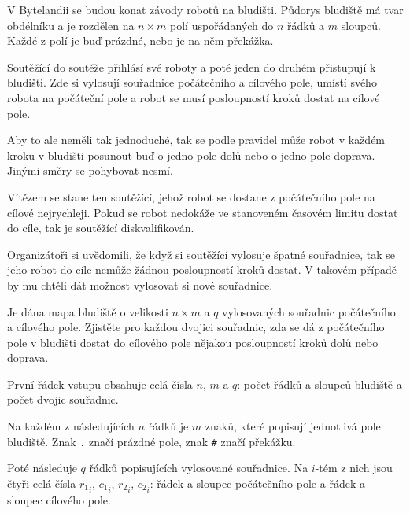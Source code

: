 





V Bytelandii se budou konat závody robotů na bludišti. Půdorys bludiště má tvar
obdélníku a je rozdělen na $n \times m$ polí uspořádaných do $n$ řádků a $m$
sloupců. Každé z polí je buď prázdné, nebo je na něm překážka.

Soutěžící do soutěže přihlásí své roboty a poté jeden do druhém přistupují
k bludišti. Zde si vylosují souřadnice počátečního a cílového pole, umístí svého
robota na počáteční pole a robot se musí posloupností kroků dostat na cílové
pole.

Aby to ale neměli tak jednoduché, tak se podle pravidel může robot v každém
kroku v bludišti posunout buď o jedno pole dolů nebo o jedno pole doprava.
Jinými směry se pohybovat nesmí.

Vítězem se stane ten soutěžící, jehož robot se dostane z počátečního pole na
cílové nejrychleji. Pokud se robot nedokáže ve stanoveném časovém limitu dostat
do cíle, tak je soutěžící diskvalifikován.

Organizátoři si uvědomili, že když si soutěžící vylosuje špatné souřadnice, tak
se jeho robot do cíle nemůže žádnou posloupností kroků dostat. V takovém případě
by mu chtěli dát možnost vylosovat si nové souřadnice.


Je dána mapa bludiště o velikosti $n \times m$ a $q$ vylosovaných souřadnic
počátečního a cílového pole. Zjistěte pro každou dvojici souřadnic, zda se dá
z počátečního pole v bludišti dostat do cílového pole nějakou posloupností kroků
dolů nebo doprava.


První řádek vstupu obsahuje celá čísla $n$, $m$ a $q$: počet řádků a sloupců
bludiště a počet dvojic souřadnic.

Na každém z následujících $n$ řádků je $m$ znaků, které popisují jednotlivá pole
bludiště. Znak \texttt{.} značí prázdné pole, znak \texttt{\#} značí překážku.

Poté následuje $q$ řádků popisujících vylosované souřadnice. Na $i$-tém z nich
jsou čtyři celá čísla ${r_1}_i$, ${c_1}_i$, ${r_2}_i$, ${c_2}_i$: řádek a
sloupec počátečního pole a řádek a sloupec cílového pole.

